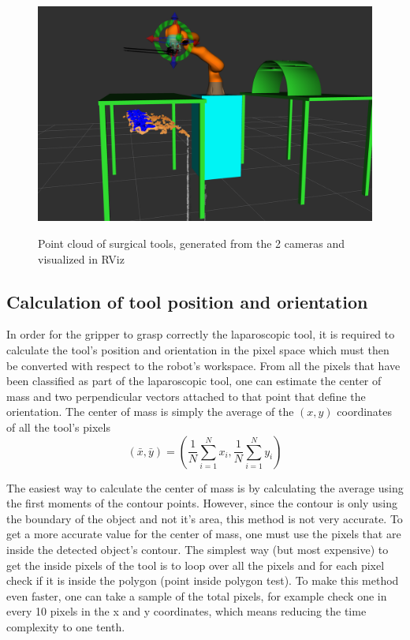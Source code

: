 \begin{center}
\begin{figure}[H]
\centering
\includegraphics[width=12cm]{images/point_cloud.png}\\
\caption{Point cloud of surgical tools, generated from the 2 cameras and visualized in RViz}
\end{figure}
\end{center}

\subsection{Calculation of tool position and orientation}

In order for the gripper to grasp correctly the laparoscopic tool, it is required to calculate the tool's position and orientation in the pixel space 
which must then be converted with respect to the robot's workspace. From all the pixels that have been classified as part of the laparoscopic tool, 
one can estimate the center of mass and two perpendicular vectors 
attached to that point that define the orientation. The center of mass is simply the average of the $(x,y)$ coordinates of all the tool's pixels
\begin{equation}
\left( \bar{x}, \bar{y} \right) = \left( \frac{1}{N}\sum_{i=1}^{N} x_i , \frac{1}{N}\sum_{i=1}^{N} y_i \right)
\end{equation}

The easiest way to calculate the center of mass is by calculating the average using the first moments of the contour points. However, since the contour is only using
the boundary of the object and not it's area, this method is not very accurate. To get a more accurate value for the center of mass, one must use the pixels that are inside 
the detected object's contour. The simplest way (but most expensive) to get the inside pixels of the tool is to loop over all the pixels and for each pixel check if it is inside the 
polygon (point inside polygon test). To make this method even faster, one can take a sample of the total pixels, for example check one in every 10 pixels in the x and y coordinates, 
which means reducing the time complexity to one tenth. \\

